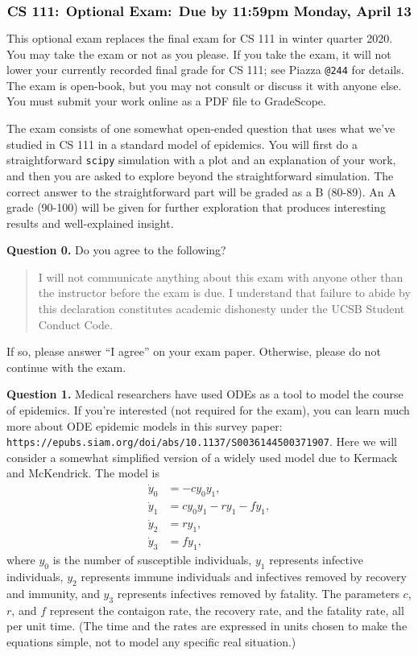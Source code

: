 \documentclass[11pt]{article}
\begin{document}
$$\mbox{\Large \bf CS 111: Optional Exam: Due by 11:59pm Monday, April 13}$$
\par\bigskip\noindent

This optional exam replaces the final exam for CS 111 in winter quarter 2020.
You may take the exam or not as you please. 
If you take the exam, 
it will not lower your currently recorded final grade for CS 111;
see Piazza {\tt @244} for details.
The exam is open-book, but you may not consult or discuss it with anyone else.
You must submit your work online as a PDF file to GradeScope.

The exam consists of one somewhat open-ended question that uses what 
we've studied in CS 111 in a standard model of epidemics.
You will first do a straightforward {\tt scipy} simulation with a plot
and an explanation of your work, 
and then you are asked to explore beyond the straightforward simulation.
The correct answer to the straightforward part will be graded as a B (80-89).
An A grade (90-100) will be given for further exploration that produces
interesting results and well-explained insight.

\par\bigskip
\noindent
{\bf Question 0.}
Do you agree to the following?
\begin{quotation}
\noindent
I will not communicate anything about this exam with anyone 
other than the instructor before the exam is due.
I understand that failure to abide by this declaration constitutes 
academic dishonesty under the UCSB Student Conduct Code.
\end{quotation}
\noindent
If so, please answer ``I agree'' on your exam paper.
Otherwise, please do not continue with the exam.

\par\bigskip
\noindent
{\bf Question 1.} 
Medical researchers have used ODEs as a tool to model the course of epidemics.
If you're interested (not required for the exam), 
you can learn much more about ODE epidemic models in this survey paper:
{\tt https://epubs.siam.org/doi/abs/10.1137/S0036144500371907}.
Here we will consider a somewhat simplified version of a 
widely used model due to Kermack and McKendrick.
The model is
\begin{align}
\dot y_0 &= -cy_0y_1, \\
\dot y_1 &= cy_0y_1 - ry_1 - fy_1, \\
\dot y_2 &= ry_1, \\
\dot y_3 &= fy_1,
\end{align}
where $y_0$ is the number of susceptible individuals,
$y_1$ represents infective individuals,
$y_2$ represents immune individuals and infectives 
removed by recovery and immunity,
and $y_3$ represents infectives removed by fatality.
The parameters $c$, $r$, and $f$ represent the contaigon rate,
the recovery rate, and the fatality rate, all per unit time.
(The time and the rates are expressed in units chosen to make the 
equations simple, not to model any specific real situation.)
\end{document}

